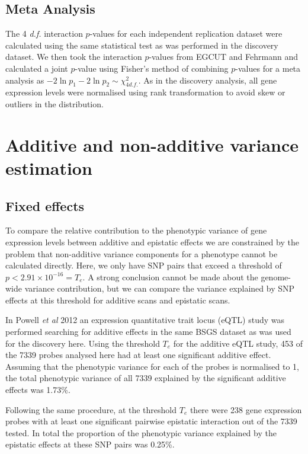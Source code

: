 \documentclass{article}
\begin{document}
\subsection{Meta Analysis}

The 4 \emph{d.f.} interaction $p$-values for each independent replication dataset were calculated using the same statistical test as was performed in the discovery dataset. We then took the interaction $p$-values from EGCUT and Fehrmann and calculated a joint $p$-value using Fisher's method of combining $p$-values for a meta analysis as $-2 \ln p_{1} - 2 \ln p_{2} \sim \chi^{2}_{4 d.f.}$. As in the discovery analysis, all gene expression levels were normalised using rank transformation to avoid skew or outliers in the distribution.



\section{Additive and non-additive variance estimation}

\subsection{Fixed effects}

To compare the relative contribution to the phenotypic variance of gene expression levels between additive and epistatic effects we are constrained by the problem that non-additive variance components for a phenotype cannot be calculated directly. Here, we only have SNP pairs that exceed a threshold of $p < 2.91 \times 10^{-16} = T_{e}$. A strong conclusion cannot be made about the genome-wide variance contribution, but we can compare the variance explained by SNP effects at this threshold for additive scans and epistatic scans. 

In Powell \emph{et al} 2012 \cite{Powell2012} an expression quantitative trait locus (eQTL) study was performed searching for additive effects in the same BSGS dataset as was used for the discovery here. Using the threshold $T_{e}$ for the additive eQTL study, 453 of the 7339 probes analysed here had at least one significant additive effect. Assuming that the phenotypic variance for each of the probes is normalised to 1, the total phenotypic variance of all 7339 explained by the significant additive effects was 1.73\%.

Following the same procedure, at the threshold $T_{e}$ there were 238 gene expression probes with at least one significant pairwise epistatic interaction out of the 7339 tested. In total the proportion of the phenotypic variance explained by the epistatic effects at these SNP pairs was 0.25\%.
\end{document}
